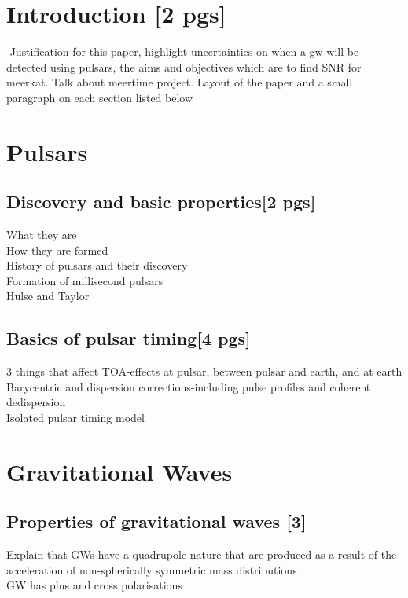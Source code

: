 \documentclass[12pt]{article}
\title{}
\author{}
\begin{document}
\maketitle

\begin{abstract}

\end{abstract}

\section{Introduction [2 pgs]}
-Justification for this paper, highlight uncertainties on when a gw will be detected using pulsars, the aims and objectives which are to find SNR for meerkat. Talk about meertime project. Layout of the paper and a small paragraph on each section listed below  
\section{Pulsars}
\subsection{Discovery and basic properties[2 pgs]}

What they are\\
How they are formed\\ 
History of pulsars and their discovery\\ 
Formation of millisecond pulsars\\
Hulse and Taylor %

\subsection{Basics of pulsar timing[4 pgs]}
3 things that affect TOA-effects at pulsar, between pulsar and earth, and at earth\\
Barycentric and dispersion corrections-including pulse profiles and coherent dedispersion\\
Isolated pulsar timing model
\section{Gravitational Waves}
\subsection{Properties of gravitational waves [3]}
Explain that GWs have a quadrupole nature that are produced as a result of the acceleration of non-spherically symmetric mass distributions\\
GW has plus and cross polarisations
\end{document}
